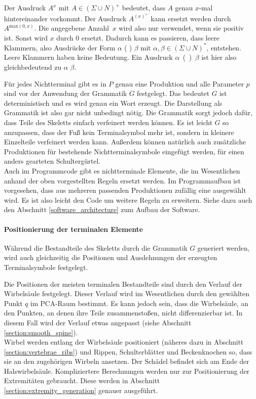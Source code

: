 Der Ausdruck $A^x$ mit $A \in (\Sigma \cup N)^+$ bedeutet, dass $A$ genau $x$-mal hintereinander vorkommt. Der Ausdruck $A^{(x)^+}$ kann ersetzt werden durch $A^{\text{max}(0, x)}$. Die angegebene \mbox{Anzahl $x$} wird also nur verwendet, wenn sie positiv ist. Sonst wird $x$ durch $0$ ersetzt. Dadurch kann es passieren, dass leere Klammern, also Ausdrücke der Form $\alpha$ ( ) $\beta$ mit $\alpha, \beta \in (\Sigma \cup N)^*$, entstehen. Leere Klammern haben keine Bedeutung. Ein Ausdruck \mbox{$\alpha$ ( ) $\beta$} ist hier also gleichbedeutend zu $\alpha$ $\beta$.

Für jedes Nichtterminal gibt es in $P$ genau eine Produktion und alle Parameter $p$ sind vor der Anwendung der Grammatik $G$ festgelegt. Das bedeutet $G$ ist deterministisch und es wird genau ein Wort erzeugt. Die Darstellung als Grammatik ist also gar nicht unbedingt nötig. Die Grammatik sorgt jedoch dafür, dass Teile des Skeletts einfach verfeinert werden können. Es ist \zb leicht $G$ so anzupassen, dass der Fuß kein Terminalsymbol mehr ist, sondern in kleinere Einzelteile verfeinert werden kann. Außerdem können natürlich auch zusätzliche Produktionen für bestehende Nichtterminalsymbole eingefügt werden, \zb für einen anders gearteten Schultergürtel.\\
Auch im Programmcode gibt es nichtterminale Elemente, die im Wesentlichen anhand der oben vorgestellten Regeln ersetzt werden. Im Programmaufbau ist vorgesehen, dass aus mehreren passenden Produktionen zufällig eine ausgewählt wird. Es ist also leicht den Code um weitere Regeln zu erweitern. Siehe dazu auch den Abschnitt \ref{software_architecture} zum Aufbau der Software.

\paragraph{Positionierung der terminalen Elemente}
Während die Bestandteile des Skeletts durch die Grammatik $G$ generiert werden, wird auch gleichzeitig die Positionen und Ausdehnungen der erzeugten Terminalsymbole festgelegt.

Die Positionen der meisten terminalen Bestandteile sind durch den Verlauf der Wirbelsäule festgelegt. Dieser Verlauf wird im Wesentlichen durch den gewählten Punkt $q$ im PCA-Raum bestimmt. Es kann jedoch sein, dass die Wirbelsäule, an den Punkten, an denen ihre Teile zusammenstoßen, nicht differenzierbar ist. In diesem Fall wird der Verlauf etwas angepasst (siehe Abschnitt \ref{section:smooth_spine}).\\
Wirbel werden entlang der Wirbelsäule positioniert (näheres dazu in Abschnitt \ref{section:vertebrae_ribs}) und Rippen, Schulterblätter und Beckenknochen so, dass sie an den zugehörigen Wirbeln ansetzen. Der Schädel befindet sich am Ende der Halswirbelsäule. Kompliziertere Berechnungen werden nur zur Positionierung der Extremitäten gebraucht. Diese werden in Abschnitt \ref{section:extremity_generation} genauer ausgeführt.

